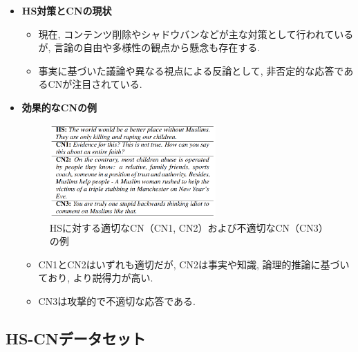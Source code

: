 \documentclass[dvipdfmx]{jsarticle}
\begin{document}
\begin{itemize}
  \item \textbf{HS対策とCNの現状}
        \begin{itemize}
          \item 現在, コンテンツ削除やシャドウバンなどが主な対策として行われているが, 言論の自由や多様性の観点から懸念も存在する.
          \item 事実に基づいた議論や異なる視点による反論として, 非否定的な応答であるCNが注目されている.
        \end{itemize}

  \item \textbf{効果的なCNの例}
        \begin{figure}[H]
          \centering
          \includegraphics[width=0.6\textwidth]{01.png}
          \caption{HSに対する適切なCN（CN1, CN2）および不適切なCN（CN3）の例 \cite{chung2021}}
          \label{fig:cn_example}
        \end{figure}
        \begin{itemize}
          \item CN1とCN2はいずれも適切だが, CN2は事実や知識, 論理的推論に基づいており, より説得力が高い.
          \item CN3は攻撃的で不適切な応答である.
        \end{itemize}
\end{itemize}

\vspace{0.5em}

\subsection{HS-CNデータセット}
\end{document}
